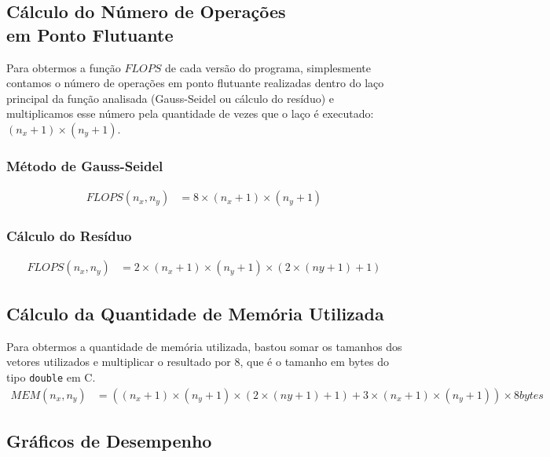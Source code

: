 \documentclass[12pt]{article}
\begin{document}
	\subsection{Cálculo do Número de Operações\\ em Ponto Flutuante}
		Para obtermos a função $FLOPS$ de cada versão do programa, simplesmente contamos o número de operações em ponto flutuante realizadas dentro do laço principal da função analisada (Gauss-Seidel ou cálculo do resíduo) e multiplicamos esse número pela quantidade de vezes que o laço é executado: $(n_x + 1)\times(n_y + 1)$.
		\subsubsection{Método de Gauss-Seidel}
		\begin{align*}
			FLOPS(n_x,n_y) &= 8\times(n_x+1)\times(n_y+1)
		\end{align*}
		\subsubsection{Cálculo do Resíduo}
		\begin{align*}
			FLOPS(n_x,n_y) &= 2\times(n_x+1)\times(n_y+1)\times(2\times(ny+1)+1)
		\end{align*}
			
	\subsection{Cálculo da Quantidade de Memória Utilizada}
		Para obtermos a quantidade de memória utilizada, bastou somar os tamanhos dos vetores utilizados e multiplicar o resultado por 8, que é o tamanho em bytes do tipo \texttt{double} em C.
		\begin{align*}
			MEM(n_x,n_y) &= ((n_x+1)\times(n_y+1)\times(2\times(ny+1)+1)+3\times(n_x+1)\times(n_y+1))\times 8bytes
		\end{align*}
		

	\newpage
	\subsection{Gráficos de Desempenho}
\end{document}
